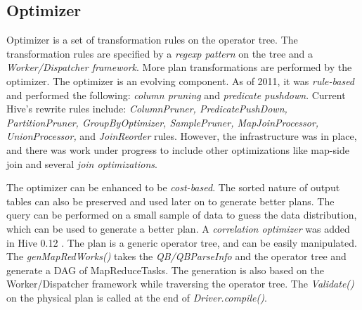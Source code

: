 \documentclass[twocolumn]{article}
\begin{document}
\subsection{Optimizer}
Optimizer is a set of transformation rules on the operator tree. The transformation rules are specified by a \textit{regexp pattern} on the tree and a \textit{Worker/Dispatcher framework}.
More plan transformations are performed by the optimizer. The optimizer is an evolving component. As of 2011, it was \textit{rule-based} and performed the following: \textit{column pruning} and \textit{predicate pushdown}. 
Current Hive's rewrite rules include:
\textit{ColumnPruner, 
  PredicatePushDown,
  PartitionPruner,
  GroupByOptimizer, 
  SamplePruner,
  MapJoinProcessor,
  UnionProcessor,}
and \textit{JoinReorder} rules.
However, the infrastructure was in place, and there was work under progress to include other optimizations like map-side join and several \textit{join optimizations}.
 
The optimizer can be enhanced to be \textit{cost-based}. The sorted nature of output tables can also be preserved and used later on to generate better plans. The query can be performed on a small sample of data to guess the data distribution, which can be used to generate a better plan.
 A \textit{correlation optimizer} was added in Hive 0.12 \cite{Huai:2014}.
The plan is a generic operator tree, and can be easily manipulated.
The \textit{genMapRedWorks()} takes the \textit{QB/QBParseInfo} and the operator tree and generate a DAG of MapReduceTasks.
The generation is also based on the Worker/Dispatcher framework while traversing the operator tree.
The \textit{Validate() }on the physical plan is called at the end of \textit{Driver.compile()}.
 
\end{document}

